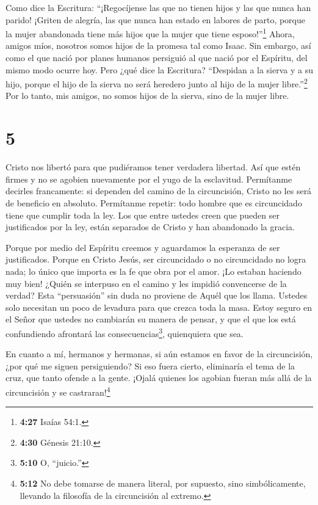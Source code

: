  Como dice la Escritura: ``¡Regocíjense las que no tienen
hijos y las que nunca han parido! ¡Griten de alegría, las que nunca han
estado en labores de parto, porque la mujer abandonada tiene más hijos
que la mujer que tiene esposo!''\footnote{\textbf{4:27} Isaías 54:1.}
 Ahora, amigos míos, nosotros somos hijos de la promesa tal
como Isaac.  Sin embargo, así como el que nació por planes
humanos persiguió al que nació por el Espíritu, del mismo modo ocurre
hoy.  Pero ¿qué dice la Escritura? ``Despidan a la sierva y
a su hijo, porque el hijo de la sierva no será heredero junto al hijo de
la mujer libre.''\footnote{\textbf{4:30} Génesis 21:10.} 
Por lo tanto, mis amigos, no somos hijos de la sierva, sino de la mujer
libre.

\hypertarget{section-4}{%
\section{5}\label{section-4}}

 Cristo nos libertó para que pudiéramos tener verdadera
libertad. Así que estén firmes y no se agobien nuevamente por el yugo de
la esclavitud.  Permítanme decirles francamente: si dependen
del camino de la circuncisión, Cristo no les será de beneficio en
absoluto.  Permítanme repetir: todo hombre que es
circuncidado tiene que cumplir toda la ley.  Los que entre
ustedes creen que pueden ser justificados por la ley, están separados de
Cristo y han abandonado la gracia.

 Porque por medio del Espíritu creemos y aguardamos la
esperanza de ser justificados.  Porque en Cristo Jesús, ser
circuncidado o no circuncidado no logra nada; lo único que importa es la
fe que obra por el amor.  ¡Lo estaban haciendo muy bien!
¿Quién se interpuso en el camino y les impidió convencerse de la verdad?
 Esta ``persuasión'' sin duda no proviene de Aquél que los
llama.  Ustedes solo necesitan un poco de levadura para que
crezca toda la masa.  Estoy seguro en el Señor que ustedes
no cambiarán su manera de pensar, y que el que los está confundiendo
afrontará las consecuencias\footnote{\textbf{5:10} O, ``juicio.''},
quienquiera que sea.

 En cuanto a mí, hermanos y hermanas, si aún estamos en
favor de la circuncisión, ¿por qué me siguen persiguiendo? Si eso fuera
cierto, eliminaría el tema de la cruz, que tanto ofende a la gente.
 ¡Ojalá quienes los agobian fueran más allá de la
circuncisión y se castraran!\footnote{\textbf{5:12} No debe tomarse de
  manera literal, por supuesto, sino simbólicamente, llevando la
  filosofía de la circuncisión al extremo.}

